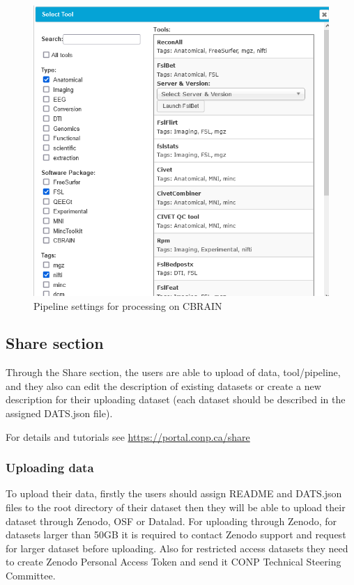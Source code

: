 \begin{figure}[ht]
  \centering
  \includegraphics[width=\textwidth]{figures/CBRAIN_toolSelection.png}
  \caption{Pipeline settings for processing on CBRAIN}
  \label{fig:cbrainPipelineSettings}
\end{figure} 

\subsection{Share section}
Through the Share section, the users are able to upload of data, tool/pipeline, and they also can edit the description of existing datasets or create a new description for their uploading dataset (each dataset should be described in the assigned DATS.json file).

For details and tutorials see \url{https://portal.conp.ca/share}

\subsubsection{Uploading data}

To upload their data, firstly the users should assign README and DATS.json files to the root directory of their dataset then they will be able to upload their dataset through Zenodo, OSF or Datalad. For uploading through Zenodo, for datasets larger than 50GB it is required to contact Zenodo support and request for larger dataset before uploading. Also for restricted access datasets they need to create Zenodo Personal Access Token and send it CONP Technical Steering Committee.


